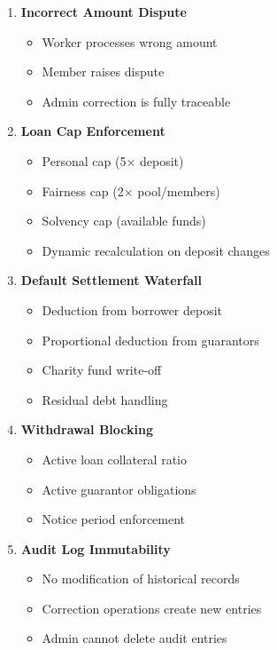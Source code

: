 \documentclass[11pt,a4paper]{article}
\begin{document}
\begin{enumerate}
    \item \textbf{Incorrect Amount Dispute}
    \begin{itemize}
        \item Worker processes wrong amount
        \item Member raises dispute
        \item Admin correction is fully traceable
    \end{itemize}
    
    \item \textbf{Loan Cap Enforcement}
    \begin{itemize}
        \item Personal cap (5× deposit)
        \item Fairness cap (2× pool/members)
        \item Solvency cap (available funds)
        \item Dynamic recalculation on deposit changes
    \end{itemize}
    
    \item \textbf{Default Settlement Waterfall}
    \begin{itemize}
        \item Deduction from borrower deposit
        \item Proportional deduction from guarantors
        \item Charity fund write-off
        \item Residual debt handling
    \end{itemize}
    
    \item \textbf{Withdrawal Blocking}
    \begin{itemize}
        \item Active loan collateral ratio
        \item Active guarantor obligations
        \item Notice period enforcement
    \end{itemize}
    
    \item \textbf{Audit Log Immutability}
    \begin{itemize}
        \item No modification of historical records
        \item Correction operations create new entries
        \item Admin cannot delete audit entries
    \end{itemize}
\end{enumerate}
\end{document}
